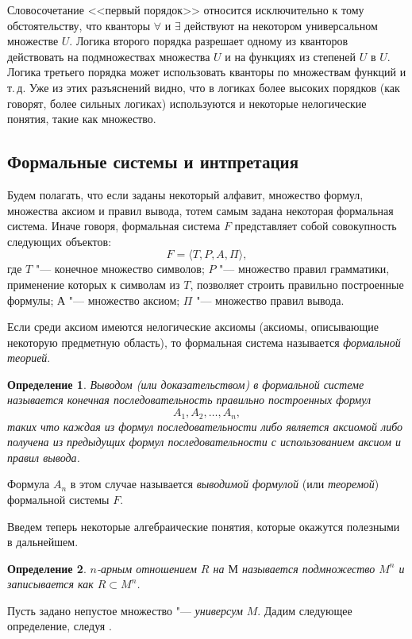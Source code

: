 \documentclass[b5paper,11pt]{book}
\newtheorem{Def}{Определение}
\numberwithin{Def}{section}
\numberwithin{Th}{chapter}
\numberwithin{St}{chapter}
\begin{document}
	Словосочетание <<первый порядок>> относится исключительно к тому обстоятельству, что кванторы $\forall$ и $\exists$ действуют на некотором универсальном множестве $U$. Логика второго порядка разрешает одному из кванторов действовать на подмножествах множества $U$ и на функциях из степеней $U$ в $U$. Логика третьего порядка может использовать кванторы по множествам функций и т.\,д. Уже из этих разъяснений видно, что в логиках более высоких порядков (как говорят, более сильных логиках) используются и некоторые нелогические понятия, такие как множество.
	
	\subsection{Формальные системы и интпретация}
	Будем полагать, что если заданы некоторый алфавит, множество формул, множества аксиом  и правил вывода, тотем самым задана некоторая формальная система. Иначе говоря, формальная система $F$ представляет собой совокупность следующих объектов:
	\[
		F=\langle T, P, A, \Pi\rangle,
	\]
	где $T$ "--- конечное множество символов; $P$ "--- множество правил грамматики, применение которых к символам из $T$, позволяет строить правильно построенные формулы; $А$ "--- множество аксиом;	$\Pi$ "--- множество правил вывода. 
	
	Если среди аксиом имеются нелогические аксиомы (аксиомы, описывающие некоторую предметную область), то формальная система называется \textit{формальной теорией}.
	\begin{Def}
		\textit{Выводом} (или \textit{доказательством}) в формальной системе называется конечная последовательность правильно построенных формул 
		\[
			A_1,A_2,\dots,A_n,
		\] таких что каждая из формул последовательности либо является аксиомой либо получена из предыдущих формул последовательности с использованием аксиом и правил вывода.
	\end{Def}
	
	Формула $A_n$ в этом случае называется \textit{выводимой формулой} (или \textit{теоремой}) формальной системы $F$.
	
	Введем теперь некоторые алгебраические понятия, которые окажутся полезными в дальнейшем.
	
	\begin{Def}
		$n$-арным отношением $R$ на $М$ называется подмножество $M^n$ и записывается как $R\subset M^n$.
	\end{Def}
	
	Пусть задано непустое множество "--- \textit{универсум} $M$. Дадим следующее определение, следуя \cite{Maltcev1970}.
	
\end{document}
